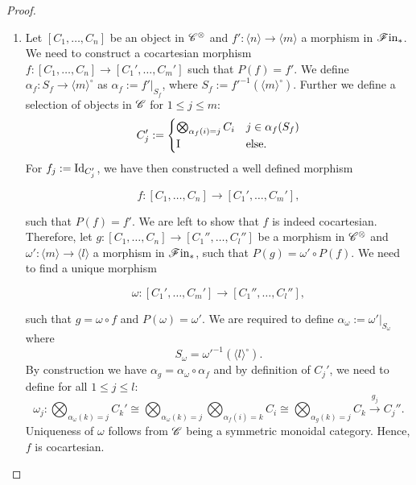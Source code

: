     \begin{proof}
        \begin{enumerate}[(M1)]
            \item Let $[C_1, \dots, C_n]$ be an object in $\mathscr{C}^{\otimes}$ and $f'
            \colon \langle n \rangle \to \langle m \rangle$ a morphism in
            $\mathscr{F} \text{in}_{\ast}$. We need to construct a cocartesian morphism $f \colon [C_1,
            \dots, C_n] \to [C_1', \dots, C_m']$ such that $P(f) = f'$. We
            define $\alpha_f \colon S_f\to \langle m \rangle^{\circ}$ as
            $\alpha_f := f'|_{S_f}$, where $S_f := f'^{-1}(\langle m
            \rangle^{\circ})$. Further we define a selection of objects in $\mathscr{C}$
            for $1 \leq j \leq m$:
            \[
                C_j' := \begin{cases}
                    \bigotimes_{\alpha_f(i)=j} C_i & j \in \alpha_f(S_f)\\
                    \operatorname{I} & \text{else.}
                \end{cases}
            \]
            For $f_j := \operatorname{Id}_{C_j'}$, we have then constructed a well defined
            morphism 
            
            $$f \colon [C_1, \dots, C_n] \to [C_1', \dots, C_m'],$$
            
            such that $P(f) = f'$. We are left to show that $f$ is indeed
            cocartesian. Therefore, let $g \colon [C_1, \dots, C_n] \to [C_1'',
            \dots, C_l'']$ be a morphism in $\mathscr{C}^{\otimes}$ and $\omega' \colon
            \langle m \rangle \to \langle l \rangle$ a morphism in $\mathscr{F} \text{in}_{\ast}$, such
            that $P(g) = \omega' \circ P(f)$. We need to find a unique morphism 
            
            $$\omega \colon [C_1', \dots, C_m'] \to [C_1'', \dots, C_l''],$$
            
            such that $g = \omega \circ f$ and $P(\omega) = \omega'$. We are
            required to define $\alpha_{\omega}:= \omega'|_{S_{\omega}}$ where 
            $$S_{\omega} = \omega'^{-1}(\langle l \rangle ^{\circ}).$$ By
            construction we have $\alpha_g = \alpha_{\omega} \circ \alpha_f$ and
            by definition of $C_j'$, we need to define for all $1 \leq j \leq
            l$:
            \[
             \omega_j \colon \bigotimes_{\alpha_{\omega}(k)=j} C_k' \cong \bigotimes_{\alpha_{\omega}(k)=j} \bigotimes_{\alpha_f(i)=k} C_i \cong \bigotimes_{\alpha_g(k)=j} C_k \xrightarrow{g_j} C_j''.
            \]
            Uniqueness of $\omega$ follows from $\mathscr{C}$ being a symmetric monoidal
            category. Hence, $f$ is cocartesian.
            

\end{enumerate}
\end{proof}
